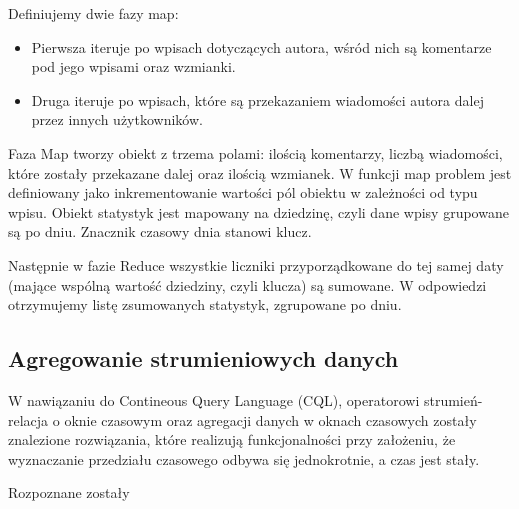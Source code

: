 

Definiujemy dwie fazy map:

\begin{itemize}[noitemsep]
  \item Pierwsza iteruje po wpisach dotyczących autora, wśród nich są komentarze pod jego wpisami oraz wzmianki.
  \item Druga iteruje po wpisach, które są przekazaniem wiadomości autora dalej przez innych użytkowników.
\end{itemize}

Faza Map tworzy obiekt z trzema polami: ilością komentarzy, liczbą wiadomości, które zostały przekazane dalej oraz ilością wzmianek. W funkcji map problem jest definiowany jako inkrementowanie wartości pól obiektu w zależności od typu wpisu. Obiekt statystyk jest mapowany na dziedzinę, czyli dane wpisy grupowane są po dniu. Znacznik czasowy dnia stanowi klucz.

Następnie w fazie Reduce wszystkie liczniki przyporządkowane do tej samej daty (mające wspólną wartość dziedziny, czyli klucza) są sumowane. W odpowiedzi otrzymujemy listę zsumowanych statystyk, zgrupowane po dniu.

\subsection{Agregowanie strumieniowych danych}

W nawiązaniu do Contineous Query Language (CQL)\cite{stream-query-gorawski}, operatorowi strumień-relacja o oknie czasowym \cite{stream-query-stanford-stochmialek}\cite{stream-processing-streamsql} oraz agregacji danych w oknach czasowych zostały znalezione rozwiązania, które realizują funkcjonalności przy założeniu, że wyznaczanie przedziału czasowego odbywa się jednokrotnie, a czas jest stały.

Rozpoznane zostały 
